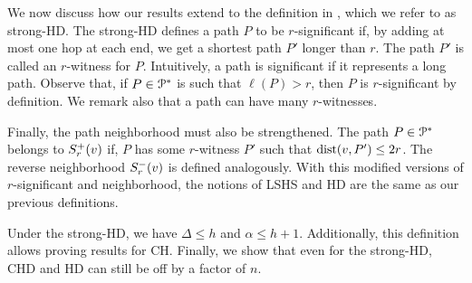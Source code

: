 We now discuss how our results extend to the definition in \citep{hd_journal}, which we refer to as strong-HD.
The strong-HD defines a path $P$ to be $r$-significant if, by adding at most one hop at each end, we get a shortest path $P'$ longer than $r$.
The path $P'$ is called an $r$-witness for $P$.
Intuitively, a path is significant if it represents a long path.
Observe that, if $P\in\mathcal{P}^*$ is such that $\ell(P)>r$, then $P$ is $r$-significant by definition.
We remark also that a path can have many $r$-witnesses.

Finally, the path neighborhood must also be strengthened.
The path $P\in\mathcal{P}^*$ belongs to $S^+_r(v)$ if, $P$ has some $r$-witness $P'$ such that $\mbox{dist}(v,P')\leq 2r$.
The reverse neighborhood $S^-_r(v)$ is defined analogously.
With this modified versions of $r$-significant and neighborhood, the notions of LSHS and HD are the same as our previous definitions.

Under the strong-HD, we have  $\Delta\leq h$ and $\alpha\leq h+1$.
Additionally, this definition allows proving results for CH.
Finally, we show that even for the strong-HD, CHD and HD can still be off by a factor of $n$.

